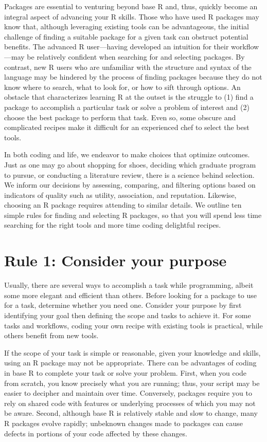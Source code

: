 \documentclass[10pt,letterpaper]{article}
\begin{document}
Packages are essential to venturing beyond base R and, thus, quickly
become an integral aspect of advancing your R skills. Those who have
used R packages may know that, although leveraging existing tools can be
advantageous, the initial challenge of finding a suitable package for a
given task can obstruct potential benefits. The advanced R user---having
developed an intuition for their workflow---may be relatively confident
when searching for and selecting packages. By contrast, new R users who
are unfamiliar with the structure and syntax of the language may be
hindered by the process of finding packages because they do not know
where to search, what to look for, or how to sift through options. An
obstacle that characterizes learning R at the outset is the struggle to
(1) find a package to accomplish a particular task or solve a problem of
interest and (2) choose the best package to perform that task. Even so,
some obscure and complicated recipes make it difficult for an
experienced chef to select the best tools.

In both coding and life, we endeavor to make choices that optimize
outcomes. Just as one may go about shopping for shoes, deciding which
graduate program to pursue, or conducting a literature review, there is
a science behind selection. We inform our decisions by assessing,
comparing, and filtering options based on indicators of quality such as
utility, association, and reputation. Likewise, choosing an R package
requires attending to similar details. We outline ten simple rules for
finding and selecting R packages, so that you will spend less time
searching for the right tools and more time coding delightful recipes.

\hypertarget{rule-1-consider-your-purpose}{%
\section{Rule 1: Consider your
purpose}\label{rule-1-consider-your-purpose}}

Usually, there are several ways to accomplish a task while programming,
albeit some more elegant and efficient than others. Before looking for a
package to use for a task, determine whether you need one. Consider your
purpose by first identifying your goal then defining the scope and tasks
to achieve it. For some tasks and workflows, coding your own recipe with
existing tools is practical, while others benefit from new tools.

If the scope of your task is simple or reasonable, given your knowledge
and skills, using an R package may not be appropriate. There can be
advantages of coding in base R to complete your task or solve your
problem. First, when you code from scratch, you know precisely what you
are running; thus, your script may be easier to decipher and maintain
over time. Conversely, packages require you to rely on shared code with
features or underlying processes of which you may not be aware. Second,
although base R is relatively stable and slow to change, many R packages
evolve rapidly; unbeknown changes made to packages can cause defects in
portions of your code affected by these changes.
\end{document}
